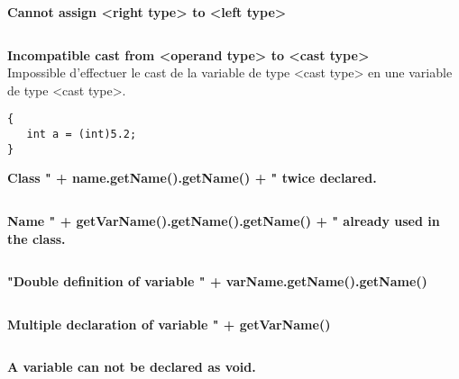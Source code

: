 \documentclass[a4,12pt]{article}
\begin{document}
\textbf{Cannot assign <right type> to <left type>}\\

\begin{lstlisting}

\end{lstlisting}



\textbf{Incompatible cast from <operand type> to <cast type>}\\
Impossible d'effectuer le cast de la variable de type <cast type> en une variable de type <cast type>.
\begin{lstlisting}
{
   int a = (int)5.2;
}
\end{lstlisting}



\textbf{Class " + name.getName().getName() + " twice declared.}\\

\begin{lstlisting}

\end{lstlisting}



\textbf{Name " + getVarName().getName().getName() + " already used in the class.}\\

\begin{lstlisting}

\end{lstlisting}



\textbf{"Double definition of variable " + varName.getName().getName()}\\

\begin{lstlisting}

\end{lstlisting}



\textbf{Multiple declaration of variable " + getVarName()}\\

\begin{lstlisting}

\end{lstlisting}



\textbf{A variable can not be declared as void.}\\

\begin{lstlisting}

\end{lstlisting}
\end{document}
